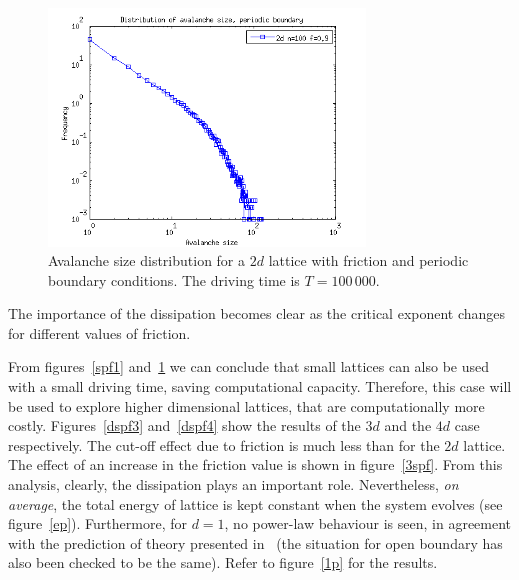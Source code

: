\begin{figure} 
\begin{center}
\includegraphics[width=0.75\textwidth]{results/spf100a.png}
\caption{Avalanche size distribution for a $2d$ lattice with friction and periodic boundary conditions. The driving time is $T=100\,000$. }
\label{spf2}
\end{center}
\end{figure} 

The importance of the dissipation becomes clear as the critical exponent changes for different values of friction.

From figures~\ref{spf1} and~\ref{spf2} we can conclude that small lattices can also be used with a small driving time, saving computational capacity. Therefore, this case will be used to explore higher dimensional lattices, that are computationally more costly. Figures~\ref{dspf3} and~\ref{dspf4} show the results of the $3d$ and the $4d$ case respectively. The cut-off effect due to friction is much less than for the $2d$ lattice. The effect of an increase in the friction value is shown in figure~\ref{3spf}. From this analysis, clearly, the dissipation plays an important role. Nevertheless, \emph{on average}, the total energy of lattice is kept constant when the system evolves (see figure~\ref{ep}). Furthermore, for $d=1$, no power-law behaviour is seen, in agreement with the prediction of theory presented in~\cite{soc} (the situation for open boundary has also been checked to be the same). Refer to figure~\ref{1p} for the results.


